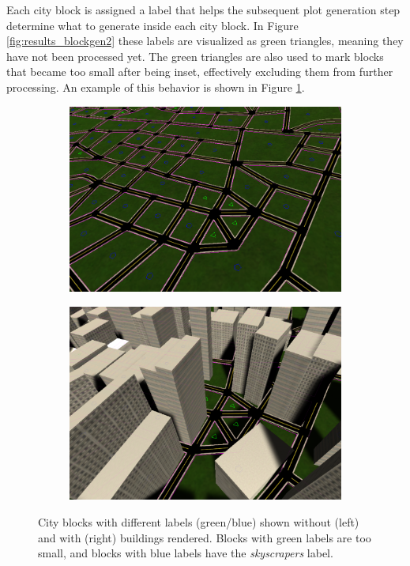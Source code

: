 Each city block is assigned a label that helps the subsequent plot generation step determine what to generate inside each city block.
In Figure \ref{fig:results_blockgen2} these labels are visualized as green triangles, meaning they have not been processed yet.
The green triangles are also used to mark blocks that became too small after being inset, effectively excluding them from further processing.
An example of this behavior is shown in Figure \ref{fig:results_blockgen3}.

\begin{figure}[h!]
  \centering
  \begin{subfigure}[b]{0.47\textwidth}
    \includegraphics[width=\textwidth]{figure/results_blockgen3.png}
  \end{subfigure}
  \quad
  \begin{subfigure}[b]{0.45\textwidth}
    \includegraphics[width=\textwidth]{figure/results_blockgen4.png}
  \end{subfigure}

  \caption{City blocks with different labels (green/blue) shown without (left) and with (right) buildings rendered. Blocks with green labels are too small, and blocks with blue labels have the \textit{skyscrapers} label.}
  \label{fig:results_blockgen3}
\end{figure}

